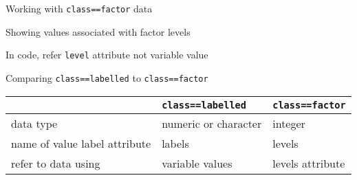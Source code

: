 \documentclass[8pt,ignorenonframetext,dvipsnames]{beamer}
\newenvironment{Shaded}{\begin{snugshade}}{\end{snugshade}}
\newcommand{\KeywordTok}[1]{\textcolor[rgb]{0.13,0.29,0.53}{\textbf{#1}}}
\newcommand{\StringTok}[1]{\textcolor[rgb]{0.31,0.60,0.02}{#1}}
\newcommand{\CommentTok}[1]{\textcolor[rgb]{0.56,0.35,0.01}{\textit{#1}}}
\newcommand{\OperatorTok}[1]{\textcolor[rgb]{0.81,0.36,0.00}{\textbf{#1}}}
\newcommand{\NormalTok}[1]{#1}
\renewcommand{\textbf}[1]{{\color{darkgray}\bfseries\fontfamily{Montserrat-TOsF}#1}}
\begin{document}
\begin{frame}[fragile]{Working with \texttt{class==factor} data}

Showing values associated with factor levels

\begin{Shaded}
\end{Shaded}

In code, refer \texttt{level} attribute not variable value

\begin{Shaded}
\end{Shaded}

\end{frame}

\begin{frame}[fragile]{Comparing \texttt{class==labelled} to
\texttt{class==factor}}

\begin{longtable}[]{@{}lll@{}}
\toprule
& \texttt{class==labelled} & \texttt{class==factor}\tabularnewline
\midrule
\endhead
data type & numeric or character & integer\tabularnewline
name of value label attribute & labels & levels\tabularnewline
refer to data using & variable values & levels attribute\tabularnewline
\bottomrule
\end{longtable}

\end{frame}
\end{document}
